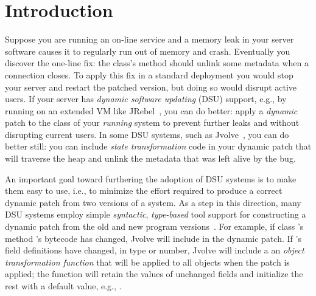 
\section{Introduction}

Suppose you are running an on-line service and a memory leak in your
server software causes it to regularly run out of memory and
crash.  Eventually you discover the one-line fix: the
 class's  method should
unlink some metadata when a connection closes.  To apply this
fix in a standard deployment you would stop your server and restart
the patched version, but doing so would disrupt active users.  If your
server has \emph{dynamic software updating} (DSU) support,
e.g., by running on an extended VM like JRebel~\cite{javarebel}, you
can do better: apply a \emph{dynamic} patch 
to the  class of your \emph{running}
system to prevent further leaks and without disrupting current users.
In some DSU systems, such as Jvolve~\cite{jvolve}, you can do better
still: you can include \emph{state 
  transformation} code in your dynamic patch that will traverse the
heap and unlink the metadata that was left alive by the bug.


An important goal toward furthering the adoption of DSU systems is to
make them easy to use, i.e., to minimize the effort required to
produce a correct dynamic patch from two versions of a system.  As a
step in this direction, many DSU systems employ simple
\emph{syntactic}, \emph{type-based} tool support for constructing a
dynamic patch from the old and new program
versions~\cite{jvolve,ksplice,neamtiu06dsu, HicksNettles03}.  For
example, if class 's method 's bytecode has changed, Jvolve
will include  in the dynamic patch.  If 's field
definitions have changed, in type or number, Jvolve will include a an
\emph{object transformation function} that will be applied to all
 objects when the patch is applied; the function will retain
the values of unchanged fields and initialize the rest with a default
value, e.g., .


